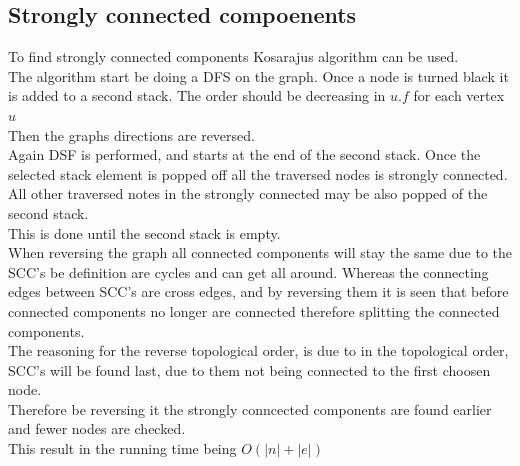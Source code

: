 \documentclass[12pt, a4paper]{article}
\begin{document}
		\subsection{Strongly connected compoenents}
			To find strongly connected components Kosarajus algorithm can be used.\\
			The algorithm start be doing a DFS on the graph. Once a node is turned black it is added to a second stack. The order should be decreasing in $u.f$ for each vertex $u$\\
			Then the graphs directions are reversed.\\
			Again DSF is performed, and starts at the end of the second stack. Once the selected stack element is popped off all the traversed nodes is strongly connected.\\
			All other traversed notes in the strongly connected may be also popped of the second stack.\\
			This is done until the second stack is empty.\\
			When reversing the graph all connected components will stay the same due to the SCC's be definition are cycles and can get all around. Whereas the connecting edges between SCC's are cross edges, and by reversing them it is seen that before connected components no longer are connected therefore splitting the connected components.\\
			The reasoning for the reverse topological order, is due to in the topological order, SCC's will be found last, due to them not being connected to the first choosen node.\\
			Therefore be reversing it the strongly conncected components are found earlier and fewer nodes are checked.\\
			This result in the running time being $O(|n|+|e|)$
\end{document}
